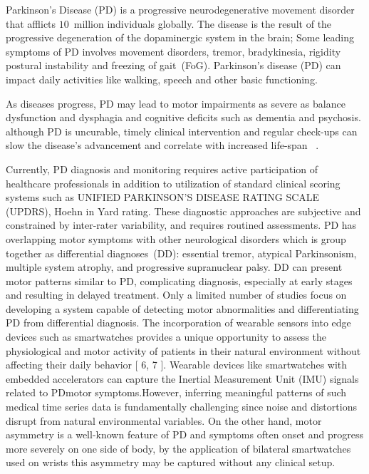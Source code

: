 \documentclass[pmlr]{jmlr}
\begin{document}
Parkinson's Disease (PD) is a progressive  neurodegenerative movement disorder that afflicts $10$~million individuals globally\citep{dorsey2018}. The disease is the result of the progressive degeneration of the dopaminergic system in the brain; Some leading symptoms of PD involves movement disorders, tremor, bradykinesia, rigidity postural instability and freezing of gait~(FoG). Parkinson’s disease (PD) can impact daily activities like walking, speech and other basic functioning.

As diseases progress, PD may lead to motor impairments as severe as balance dysfunction and dysphagia and cognitive deficits such as dementia and psychosis. although PD is uncurable, timely clinical intervention and regular check-ups can slow the disease's advancement and correlate with increased life-span ~\citep{bloem2021}.

Currently, PD diagnosis and monitoring requires active participation of healthcare professionals in addition to utilization of standard clinical scoring systems such as UNIFIED PARKINSON'S DISEASE RATING SCALE (UPDRS), Hoehn in Yard rating. These diagnostic approaches are subjective and constrained by inter-rater variability, and requires routined assessments. PD has overlapping motor symptoms with other neurological disorders which is group together as differential diagnoses~(DD): essential tremor, atypical Parkinsonism, multiple system atrophy, and progressive supranuclear palsy. DD can present motor patterns similar to PD, complicating diagnosis, especially at early stages and resulting in delayed treatment.
Only a limited number of studies focus on developing a system capable of detecting motor abnormalities and differentiating PD from differential diagnosis. The incorporation of wearable sensors into edge devices such as smartwatches provides a unique opportunity to assess the physiological and motor activity of patients in their natural environment without affecting their daily behavior [ 6, 7 ]. Wearable devices like smartwatches with embedded accelerators can capture the Inertial Measurement Unit (IMU) signals related to PD\@ motor symptoms.However, inferring meaningful patterns of such medical time series data is fundamentally challenging since noise and distortions disrupt from natural environmental variables. 
On the other hand, motor asymmetry is a well-known feature of PD and symptoms often onset and progress more severely on one side of body, by the application of bilateral smartwatches used on wrists this asymmetry may be captured without any clinical setup.
\end{document}
